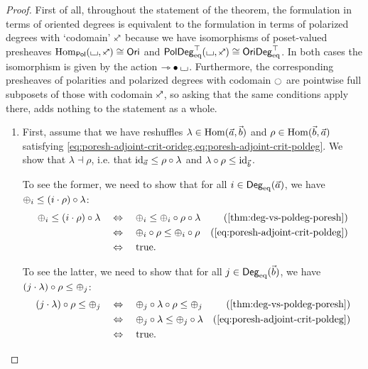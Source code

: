 \documentclass[a4paper]{memoir}
\begin{document}
\begin{proof}
	First of all, throughout the statement of the theorem, the formulation in terms of oriented degrees is equivalent to the formulation in terms of polarized degrees with `codomain' $\ypolar$ because we have isomorphisms of poset-valued presheaves $\Hom_\polcat(\loch, \ypolar) \cong \oripsh$ and $\poldegeqtop(\loch, \ypolar) \cong \oridegeqtop$.
	In both cases the isomorphism is given by the action ${\rightarrowtriangle} \mathbin{\bullet} {\llcorner\hspace{-.4ex}\lrcorner}$.
	Furthermore, the corresponding presheaves of polarities and polarized degrees with codomain $\npolar$ are pointwise full subposets of those with codomain $\ypolar$, so asking that the same conditions apply there, adds nothing to the statement as a whole.
	\begin{enumerate}
		\item First, assume that we have reshuffles $\lambda \in {\mathrm{Hom}}(\vec a, \vec b)$ and $\rho \in {\mathrm{Hom}}(\vec b, \vec a)$ satisfying \cref{eq:poresh-adjoint-crit-orideg,eq:poresh-adjoint-crit-poldeg}.
		We show that $\lambda \dashv \rho$, i.e. that $\mathrm{id}_{\vec a} \leq \rho \circ \lambda$ and $\lambda \circ \rho \leq \mathrm{id}_{\vec b}$.
		
		To see the former, we need to show that for all $i \in {\mathsf{Deg}_{\mathrm{eq}}}(\vec a)$, we have ${\oplus}_i \leq (i \cdot \rho) \circ \lambda$:
		\begin{align*}
			\pospol_i \leq (i \cdot \rho) \circ \lambda
			&\quad\Leftrightarrow\quad
			\pospol_i \leq \pospol_i \circ \rho \circ \lambda
			& \text{(\cref{thm:deg-vs-poldeg-poresh})} \\
			&\quad\Leftrightarrow\quad
			\pospol_i \circ \rho \leq \pospol_i \circ \rho
			& \text{(\cref{eq:poresh-adjoint-crit-poldeg})} \\
			&\quad\Leftrightarrow\quad
			\text{true}.
		\end{align*}
		
		To see the latter, we need to show that for all $j \in {\mathsf{Deg}_{\mathrm{eq}}}(\vec b)$, we have $(j \cdot \lambda) \circ \rho \leq {\oplus}_j$:
		\begin{align*}
			(j \cdot \lambda) \circ \rho \leq \pospol_j
			&\quad\Leftrightarrow\quad
			\pospol_j \circ \lambda \circ \rho \leq \pospol_j
			& \text{(\cref{thm:deg-vs-poldeg-poresh})} \\
			&\quad\Leftrightarrow\quad
			\pospol_j \circ \lambda \leq \pospol_j \circ \lambda
			& \text{(\cref{eq:poresh-adjoint-crit-poldeg})} \\
			&\quad\Leftrightarrow\quad
			\text{true}.
		\end{align*}
		

\end{enumerate}
\end{proof}
\end{document}

